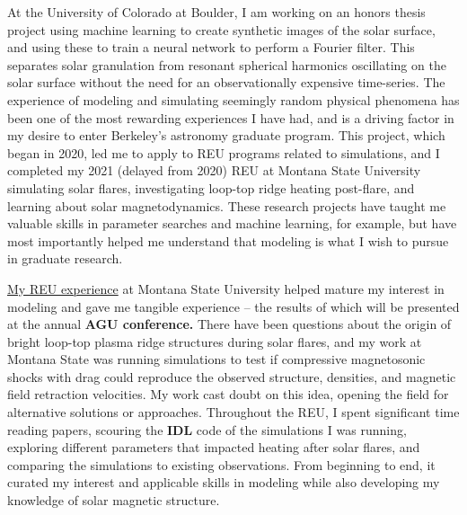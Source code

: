 \documentclass[11pt,letterpaper]{article}
\begin{document}
At the University of Colorado at Boulder, I am working on an honors thesis project using machine learning to create synthetic images of the solar surface, and using these to train a neural network to perform a Fourier filter. This separates solar granulation from resonant spherical harmonics oscillating on the solar surface without the need for an observationally expensive time-series. The experience of modeling and simulating seemingly random physical phenomena has been one of the most rewarding experiences I have had, and is a driving factor in my desire to enter Berkeley's  astronomy graduate program. This project, which began in 2020, led me to apply to REU programs related to simulations, and I completed my 2021 (delayed from 2020) REU at Montana State University simulating solar flares, investigating loop-top ridge heating post-flare, and learning about solar magnetodynamics. These research projects have taught me valuable skills in parameter searches and machine learning, for example, but have most importantly helped me understand that modeling is what I wish to pursue in graduate research.
 
\href{http://solar.physics.montana.edu/www/reu/2021/mccreery/}{My REU experience} at Montana State University helped mature my interest in modeling and gave me tangible experience – the results of which will be presented at the annual \textbf{AGU conference.} There have been questions about the origin of bright loop-top plasma ridge structures during solar flares, and my work at Montana State was running simulations to test if compressive magnetosonic shocks with drag could reproduce the observed structure, densities, and magnetic field retraction velocities. My work cast doubt on this idea, opening the field for alternative solutions or approaches. Throughout the REU, I spent significant time reading papers, scouring the \textbf{IDL} code of the simulations I was running, exploring different parameters that impacted heating after solar flares, and comparing the simulations to existing observations. From beginning to end, it curated my interest and applicable skills in modeling while also developing my knowledge of solar magnetic structure. 
\end{document}

